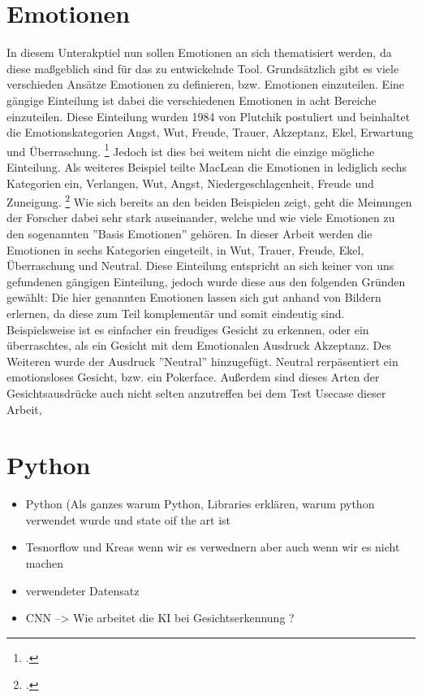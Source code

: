 \documentclass[12pt, a4paper]{scrbook}
\begin{document}
\section{Emotionen}
In diesem Unterakptiel nun sollen Emotionen an sich thematisiert werden, da diese maßgeblich sind für das zu entwickelnde Tool. Grundsätzlich gibt es viele verschieden Ansätze Emotionen zu definieren, bzw. Emotionen einzuteilen. Eine gängige Einteilung ist dabei die verschiedenen Emotionen in acht Bereiche einzuteilen. Diese Einteilung wurden 1984 von Plutchik postuliert und beinhaltet die Emotionskategorien Angst, Wut, Freude, Trauer, Akzeptanz, Ekel, Erwartung und Überraschung.
\footcite[Vgl. ][3]{FaceRec}
Jedoch ist dies bei weitem nicht die einzige mögliche Einteilung. Als weiteres Beispiel teilte MacLean  die Emotionen in lediglich sechs Kategorien ein, Verlangen, Wut, Angst, Niedergeschlagenheit, Freude und Zuneigung.
\footcite[Vgl. ][3]{FaceRec}
Wie sich bereits an den beiden Beispielen zeigt, geht die Meinungen der Forscher  dabei sehr stark auseinander, welche und wie viele Emotionen zu den sogenannten ''Basis Emotionen'' gehören. In dieser Arbeit werden die Emotionen in sechs Kategorien eingeteilt, in Wut, Trauer, Freude, Ekel, Überraschung und Neutral. Diese Einteilung entspricht an sich keiner von uns gefundenen gängigen Einteilung, jedoch wurde diese aus den folgenden Gründen gewählt:
Die hier genannten Emotionen lassen sich gut anhand von Bildern erlernen, da diese zum Teil komplementär und somit eindeutig sind. Beispielsweise ist es einfacher ein freudiges Gesicht zu erkennen, oder ein überraschtes, als ein Gesicht mit dem Emotionalen Ausdruck Akzeptanz. Des Weiteren wurde der Ausdruck ''Neutral'' hinzugefügt. Neutral rerpäsentiert ein emotionsloses Gesicht, bzw. ein Pokerface. Außerdem sind dieses Arten der Gesichtsausdrücke auch nicht selten anzutreffen bei dem Test Usecase dieser Arbeit,

\section{Python}
\begin{itemize}
\item Python (Als ganzes warum Python, Libraries erklären, warum python verwendet wurde und state oif the art ist
\item Tesnorflow und Kreas wenn wir es verwednern aber auch wenn wir es nicht machen
\item verwendeter Datensatz
\item CNN --> Wie arbeitet die KI bei Gesichtserkennung ?
\end{itemize}
\let\cleardoublepage\relax
\newpage
\end{document}
